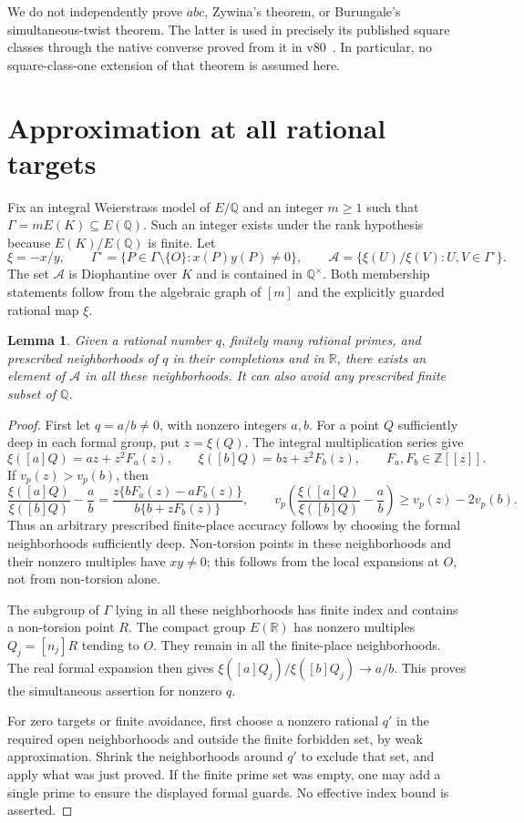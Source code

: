 \documentclass[11pt,a4paper]{article}
\newtheorem{lemma}[theorem]{Lemma}
\newcommand{\Q}{\mathbb Q}\newcommand{\Z}{\mathbb Z}
\begin{document}
We do not independently prove $abc$, Zywina's theorem, or Burungale's
simultaneous-twist theorem. The latter is used in precisely its published
square classes through the native converse proved from it in
v80~\cite{Burungale,v80}. In particular, no square-class-one extension
of that theorem is assumed here.

\section{Approximation at all rational targets}

Fix an integral Weierstrass model of $E/\Q$ and an integer $m\ge1$
such that $\Gamma=mE(K)\subseteq E(\Q)$. Such an integer exists under
the rank hypothesis because $E(K)/E(\Q)$ is finite. Let
\[
 \xi=-x/y,\qquad
 \Gamma^\circ=\{P\in\Gamma\setminus\{O\}:x(P)y(P)\ne0\},
 \qquad
 \mathcal A=\{\xi(U)/\xi(V):U,V\in\Gamma^\circ\}.
\]
The set $\mathcal A$ is Diophantine over $K$ and is contained in
$\Q^\times$. Both membership statements follow from the algebraic
graph of $[m]$ and the explicitly guarded rational map $\xi$.

\begin{lemma}\label{lem:density}
Given a rational number $q$, finitely many rational primes, and prescribed
neighborhoods of $q$ in their completions and in $\mathbb R$, there
exists an element of $\mathcal A$ in all these neighborhoods.
It can also avoid any prescribed finite subset of $\Q$.
\end{lemma}
\begin{proof}
First let $q=a/b\ne0$, with nonzero integers $a,b$.
For a point $Q$ sufficiently deep in each formal group, put $z=\xi(Q)$.
The integral multiplication series give
\[
 \xi([a]Q)=az+z^2F_a(z),\qquad
 \xi([b]Q)=bz+z^2F_b(z),\qquad F_a,F_b\in\Z[[z]].
\]
If $v_p(z)>v_p(b)$, then
\[
 \frac{\xi([a]Q)}{\xi([b]Q)}-\frac ab
 =\frac{z\{bF_a(z)-aF_b(z)\}}{b\{b+zF_b(z)\}},
 \qquad
 v_p\left(\frac{\xi([a]Q)}{\xi([b]Q)}-\frac ab\right)
 \ge v_p(z)-2v_p(b).
\]
Thus an arbitrary prescribed finite-place accuracy follows by choosing
the formal neighborhoods sufficiently deep. Non-torsion points in these
neighborhoods and their nonzero multiples have $xy\ne0$; this follows
from the local expansions at $O$, not from non-torsion alone.

The subgroup of $\Gamma$ lying in all these neighborhoods has finite
index and contains a non-torsion point $R$. The compact group $E(\mathbb R)$
has nonzero multiples $Q_j=[n_j]R$ tending to $O$. They remain in all
the finite-place neighborhoods. The real formal expansion then gives
$\xi([a]Q_j)/\xi([b]Q_j)\longrightarrow a/b$. This proves the
simultaneous assertion for nonzero $q$.

For zero targets or finite avoidance, first choose a nonzero rational
$q'$ in the required open neighborhoods and outside the finite forbidden
set, by weak approximation. Shrink the neighborhoods around $q'$ to
exclude that set, and apply what was just proved. If the finite prime
set was empty, one may add a single prime to ensure the displayed
formal guards. No effective index bound is asserted.
\end{proof}
\end{document}
